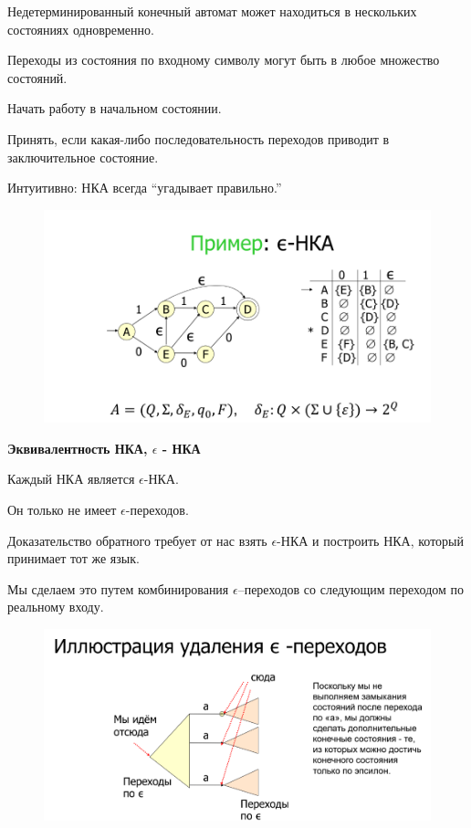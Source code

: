 \documentclass{article}
\begin{document}
Недетерминированный конечный автомат может находиться
в нескольких состояниях одновременно.

Переходы из состояния по входному символу могут быть в
любое множество состояний.

Начать работу в начальном состоянии.

Принять, если какая-либо последовательность переходов
приводит в заключительное состояние.

Интуитивно: НКА всегда “угадывает правильно.”

\begin{figure}[H]
    \centering
    \includegraphics[width=1\linewidth]{Снимок экрана 2025-03-20 082634.png}
\end{figure}


\textbf{Эквивалентность НКА, $\epsilon$ - НКА}


Каждый НКА является $\epsilon$-НКА.

Он только не имеет $\epsilon$-переходов.

Доказательство обратного требует от нас взять
$\epsilon$-НКА и построить НКА, который принимает тот
же язык.

Мы сделаем это путем комбинирования
$\epsilon$–переходов со следующим переходом по
реальному входу.

\begin{figure}[H]
    \centering
    \includegraphics[width=1\linewidth]{Снимок экрана 2025-03-20 082840.png}
\end{figure}
\end{document}
